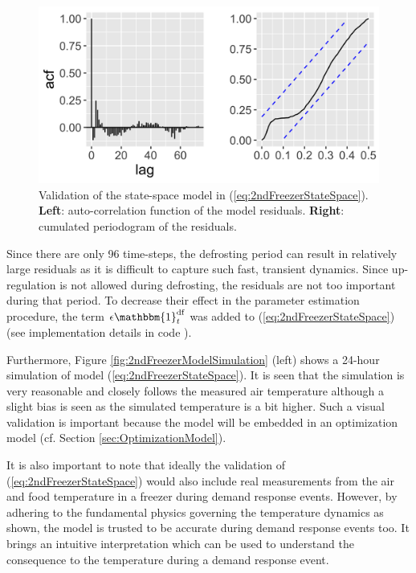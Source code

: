 \begin{figure}[!t]
    \centering
    \includegraphics[width=\columnwidth]{../figures/2ndFreezerModelValidation.png}
    \caption{ Validation of the state-space model in (\ref{eq:2ndFreezerStateSpace}). \textbf{Left}: auto-correlation function of the model residuals. \textbf{Right}: cumulated periodogram of the residuals.}
    \label{fig:2ndFreezerModelValidation}
\end{figure}

Since there are only 96 time-steps, the defrosting period can result in relatively large residuals as it is difficult to capture such fast, transient dynamics. Since up-regulation is not allowed during defrosting, the residuals are not too important during that period. To decrease their effect in the parameter estimation procedure, the term $ \epsilon \mathbbm{1}^{\text{df}}_{t}$ was added to (\ref{eq:2ndFreezerStateSpace}) (see implementation details in code \cite{}).

Furthermore, Figure \ref{fig:2ndFreezerModelSimulation} (left) shows a 24-hour simulation of model (\ref{eq:2ndFreezerStateSpace}). It is seen that the simulation is very reasonable and closely follows the measured air temperature although a slight bias is seen as the simulated temperature is a bit higher. Such a visual validation is important because the model will be embedded in an optimization model (cf. Section \ref{sec:OptimizationModel}).

It is also important to note that ideally the validation of (\ref{eq:2ndFreezerStateSpace}) would also include real measurements from the air and food temperature in a freezer during demand response events. However, by adhering to the fundamental physics governing the temperature dynamics as shown, the model is trusted to be accurate during demand response events too. It brings an intuitive interpretation which can be used to understand the consequence to the temperature during a demand response event.

